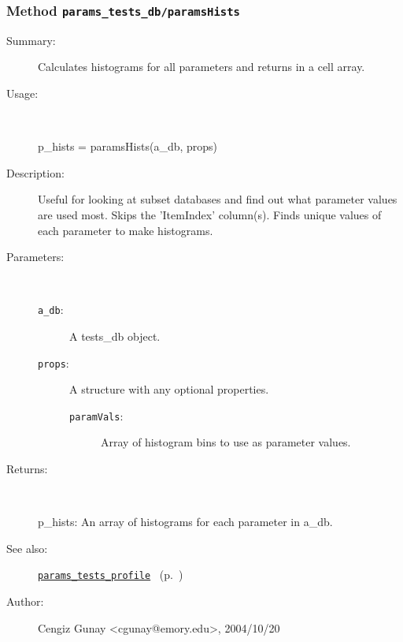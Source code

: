\subsubsection[Method \texttt{paramsHists}]{Method \texttt{params\_tests\_db/paramsHists}}%
%
\label{ref_params_tests_db__paramsHists}%
\hypertarget{ref_params_tests_db__paramsHists}{}%
\begin{description}
\item[Summary:]Calculates histograms for all parameters and returns in a 
		cell array.
%
\item[Usage:]~%
\begin{lyxcode}%
p\_hists = paramsHists(a\_db, props)
%
\end{lyxcode}%
%
\item[Description:]%
Useful for looking at subset databases and find out what parameter
 values are used most. Skips the 'ItemIndex' column(s). Finds unique values
 of each parameter to make histograms.
\item[Parameters:]~
\begin{description}%
\item[\texttt{a\_db}:]
 A tests\_db object.
\item[\texttt{props}:]
 A structure with any optional properties.
\begin{description}%
\item[\texttt{paramVals}:]
 Array of histogram bins to use as parameter values.
\end{description}%
\end{description}%
%
\item[Returns:
]~

   p\_hists: An array of histograms for each parameter in a\_db.
%
%
\item[See also:]%
\hyperlink{ref_params_tests_profile}{\texttt{params\_tests\_profile}}%
\ (p.~\pageref{ref_params_tests_profile})%
%
%
\item[Author:]%
Cengiz Gunay <cgunay@emory.edu>, 2004/10/20
%
\end{description}
\methodline%
